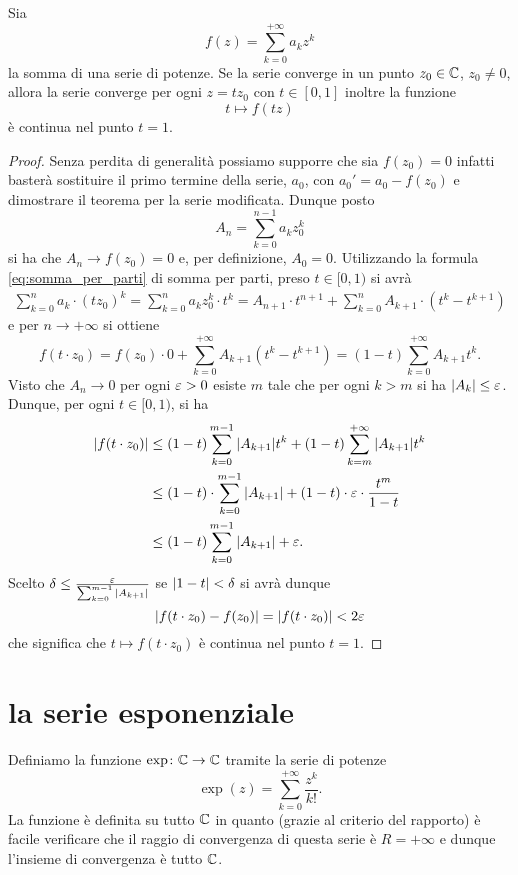 \begin{theorem}
\mymark{*}
\label{th:lemma_abel}
Sia
\[
  f(z) = \sum_{k=0}^{+\infty} a_k z^k
\]
la somma di una serie di potenze. Se la serie converge in un punto $z_0\in {\mathbb C}$, $z_0\neq 0$, allora la serie converge per ogni $z=t z_0$ con $t\in [0,1]$ inoltre la funzione
\[
  t \mapsto f(tz)
\]
è continua nel punto $t=1$.
\end{theorem}
%
\begin{proof}
Senza perdita di generalità possiamo supporre che sia $f(z_0)=0$ infatti basterà sostituire il primo termine della serie, $a_0$, con $a_0' = a_0 - f(z_0)$ e dimostrare il teorema per la serie modificata.
Dunque posto
\[
  A_n = \sum_{k=0}^{n-1} a_k z_0^k
\]
si ha che $A_n \to f(z_0) = 0$ e, per definizione, $A_0 = 0$.
Utilizzando la formula \eqref{eq:somma_per_parti} di somma per parti, preso $t\in [0,1)$
si avrà
\begin{align*}
\sum_{k=0}^n a_k \cdot (tz_0)^k
= \sum_{k=0}^n a_k z_0^k \cdot t^k
= A_{n+1} \cdot t^{n+1} + \sum_{k=0}^n A_{k+1}\cdot (t^k - t^{k+1})
\end{align*}
e per $n\to +\infty$ si ottiene
\[
  f(t\cdot z_0) = f(z_0)\cdot 0 + \sum_{k=0}^{+\infty}A_{k+1}(t^k-t^{k+1})
  = (1-t)\sum_{k=0}^{+\infty} A_{k+1} t^k.
\]
Visto che $A_n \to 0$ per ogni $\varepsilon>0$ esiste $m$ tale che per ogni $k > m$ si ha ${\left|A_k\right|} \le  \varepsilon$. Dunque, per ogni $t\in [0,1)$, si ha
\begin{align*}
{\left|f(t\cdot z_0)\right|}
 &\le (1-t)\sum_{k=0}^{m-1} {\left|A_{k+1}\right|} t^k
  + (1-t)\sum_{k=m}^{+\infty} {\left|A_{k+1}\right|} t^k \\
 &\le (1-t)\cdot \sum_{k=0}^{m-1}{\left|A_{k+1}\right|} + (1-t)\cdot \varepsilon \cdot \frac{t^{m}}{1-t} \\
 &\le (1-t)\sum_{k=0}^{m-1}{\left|A_{k+1}\right|} + \varepsilon.
\end{align*}
Scelto $\delta \le \frac{\varepsilon} {\sum_{k=0}^{m-1} {\left|A_{k+1}\right|}}$ se ${\left|1-t\right|}<\delta$ si avrà
dunque
\[
  {\left|f(t\cdot z_0)-f(z_0)\right|} = {\left|f(t\cdot z_0)\right|} < 2\varepsilon
\]
che significa che $t\mapsto f(t\cdot z_0)$ è continua nel punto $t=1$.
\end{proof}


\section{la serie esponenziale}

Definiamo la funzione $\exp \colon {\mathbb C} \to {\mathbb C}$
tramite la serie di potenze
\begin{equation}\label{eq:def_exp}
\exp(z) = \sum_{k=0}^{+\infty} \frac{z^k}{k!}.
\end{equation}
La funzione è definita su tutto ${\mathbb C}$ in quanto (grazie al criterio del rapporto)
è facile verificare che il raggio di convergenza di questa serie è $R=+\infty$
e dunque l'insieme di convergenza è tutto ${\mathbb C}$.

